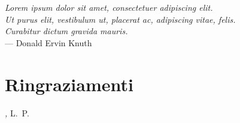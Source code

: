 
\cleardoublepage
{}
{}

\begin{flushright}{\slshape    
	Lorem ipsum dolor sit amet, consectetuer adipiscing elit. \\
	Ut purus elit, vestibulum ut, placerat ac, adipiscing vitae, felis. \\
	Curabitur dictum gravida mauris.} \\ \medskip
    --- Donald Ervin Knuth
\end{flushright}


\bigskip

\begingroup
\let\clearpage\relax
\let\cleardoublepage\relax
\let\cleardoublepage\relax

\chapter*{Ringraziamenti}

\lipsum[1]

\bigskip
 
\noindent\textit{\myLocation, \MakeTextLowercase{\myTime}}
\hfill L.~P.

\endgroup